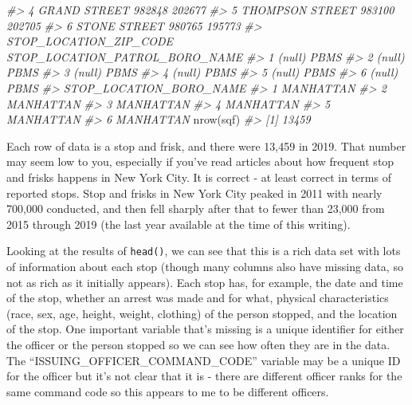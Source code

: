 \documentclass[
]{krantz}
\makeatletter
\newenvironment{Shaded}{\begin{snugshade}}{\end{snugshade}}
\newcommand{\CommentTok}[1]{\textcolor[rgb]{0.37,0.37,0.37}{\textit{#1}}}
\newcommand{\FunctionTok}[1]{\textcolor[rgb]{0,0,0}{#1}}
\newcommand{\NormalTok}[1]{#1}
\newenvironment{kframe}{%
\medskip{}
\setlength{\fboxsep}{.8em}
 \def\at@end@of@kframe{}%
 \ifinner\ifhmode%
  \def\at@end@of@kframe{\end{minipage}}%
  \begin{minipage}{\columnwidth}%
 \fi\fi%
 \def\FrameCommand##1{\hskip\@totalleftmargin \hskip-\fboxsep
 \colorbox{shadecolor}{##1}\hskip-\fboxsep
     \hskip-\linewidth \hskip-\@totalleftmargin \hskip\columnwidth}%
 \MakeFramed {\advance\hsize-\width
   \@totalleftmargin\z@ \linewidth\hsize
   \@setminipage}}%
 {\par\unskip\endMakeFramed%
 \at@end@of@kframe}
\renewenvironment{Shaded}{\begin{kframe}}{\end{kframe}}
\makeatother
\begin{document}
\begin{Shaded}
\begin{Highlighting}[]
\CommentTok{\#\textgreater{} 4              GRAND STREET          982848          202677}
\CommentTok{\#\textgreater{} 5           THOMPSON STREET          983100          202705}
\CommentTok{\#\textgreater{} 6              STONE STREET          980765          195773}
\CommentTok{\#\textgreater{}   STOP\_LOCATION\_ZIP\_CODE STOP\_LOCATION\_PATROL\_BORO\_NAME}
\CommentTok{\#\textgreater{} 1                 (null)                           PBMS}
\CommentTok{\#\textgreater{} 2                 (null)                           PBMS}
\CommentTok{\#\textgreater{} 3                 (null)                           PBMS}
\CommentTok{\#\textgreater{} 4                 (null)                           PBMS}
\CommentTok{\#\textgreater{} 5                 (null)                           PBMS}
\CommentTok{\#\textgreater{} 6                 (null)                           PBMS}
\CommentTok{\#\textgreater{}   STOP\_LOCATION\_BORO\_NAME}
\CommentTok{\#\textgreater{} 1               MANHATTAN}
\CommentTok{\#\textgreater{} 2               MANHATTAN}
\CommentTok{\#\textgreater{} 3               MANHATTAN}
\CommentTok{\#\textgreater{} 4               MANHATTAN}
\CommentTok{\#\textgreater{} 5               MANHATTAN}
\CommentTok{\#\textgreater{} 6               MANHATTAN}
\FunctionTok{nrow}\NormalTok{(sqf)}
\CommentTok{\#\textgreater{} [1] 13459}
\end{Highlighting}
\end{Shaded}

Each row of data is a stop and frisk, and there were 13,459 in 2019. That number may seem low to you, especially if you've read articles about how frequent stop and frisks happens in New York City. It is correct - at least correct in terms of reported stops. Stop and frisks in New York City peaked in 2011 with nearly 700,000 conducted, and then fell sharply after that to fewer than 23,000 from 2015 through 2019 (the last year available at the time of this writing).

Looking at the results of \texttt{head()}, we can see that this is a rich data set with lots of information about each stop (though many columns also have missing data, so not as rich as it initially appears). Each stop has, for example, the date and time of the stop, whether an arrest was made and for what, physical characteristics (race, sex, age, height, weight, clothing) of the person stopped, and the location of the stop. One important variable that's missing is a unique identifier for either the officer or the person stopped so we can see how often they are in the data. The ``ISSUING\_OFFICER\_COMMAND\_CODE'' variable may be a unique ID for the officer but it's not clear that it is - there are different officer ranks for the same command code so this appears to me to be different officers.
\end{document}
